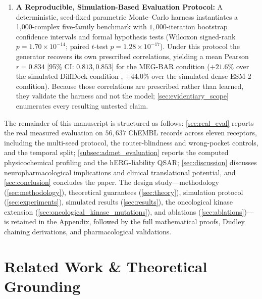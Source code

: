 \documentclass{article}
\theoremstyle{definition}
\begin{document}
\begin{enumerate}[leftmargin=1.5em,noitemsep]
    \item \textbf{A Reproducible, Simulation-Based Evaluation Protocol:} A deterministic, seed-fixed parametric Monte--Carlo harness instantiates a 1,000-complex five-family benchmark with $1,000$-iteration bootstrap confidence intervals and formal hypothesis tests (Wilcoxon signed-rank $p = 1.70 \times 10^{-14}$; paired $t$-test $p = 1.28 \times 10^{-17}$). Under this protocol the generator recovers its own prescribed correlations, yielding a mean Pearson $r = 0.834$ [95\% CI: $0.813, 0.853$] for the MEG-BAR condition ($+21.6\%$ over the simulated DiffDock condition \citep{corso2023diffdock}, $+44.0\%$ over the simulated dense ESM-2 condition). Because those correlations are prescribed rather than learned, they validate the harness and not the model; \cref{sec:evidentiary_scope} enumerates every resulting untested claim.
\end{enumerate}

The remainder of this manuscript is structured as follows: \cref{sec:real_eval} reports the real measured evaluation on $56{,}637$ ChEMBL records across eleven receptors, including the multi-seed protocol, the router-blindness and wrong-pocket controls, and the temporal split; \cref{subsec:admet_evaluation} reports the computed physicochemical profiling and the hERG-liability QSAR; \cref{sec:discussion} discusses neuropharmacological implications and clinical translational potential, and \cref{sec:conclusion} concludes the paper. The design study---methodology (\cref{sec:methodology}), theoretical guarantees (\cref{sec:theory}), simulation protocol (\cref{sec:experiments}), simulated results (\cref{sec:results}), the oncological kinase extension (\cref{sec:oncological_kinase_mutations}), and ablations (\cref{sec:ablations})---is retained in the Appendix, followed by the full mathematical proofs, Dudley chaining derivations, and pharmacological validations.

\section{Related Work \& Theoretical Grounding}
\label{sec:related_work}
\end{document}

